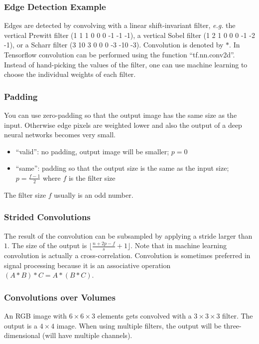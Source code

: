 \documentclass{article}
\begin{document}
\subsubsection{Edge Detection Example}
Edges are detected by convolving with a linear shift-invariant filter, \emph{e.g.} the vertical Prewitt filter
(1 1 1 0 0 0 -1 -1 -1), a vertical Sobel filter (1 2 1 0 0 0 -1 -2 -1), or a Scharr filter
(3 10 3 0 0 0 -3 -10 -3).
Convolution is denoted by $*$.
In Tensorflow convolution can be performed using the function ``tf.nn.conv2d''.
Instead of hand-picking the values of the filter, one can use machine learning to choose the individual weights of each filter.

\subsubsection{Padding}
You can use zero-padding so that the output image has the same size as the input.
Otherwise edge pixels are weighted lower and also the output of a deep neural networks becomes very small.
\begin{itemize}
  \item ``valid'': no padding, output image will be smaller; $p=0$
  \item ``same'': padding so that the output size is the same as the input size; $p=\frac{f-1}{2}$ where $f$ is the filter size
\end{itemize}
The filter size $f$ usually is an odd number.

\subsubsection{Strided Convolutions}
The result of the convolution can be subsampled by applying a stride larger than $1$.
The size of the output is $\lfloor\frac{n+2p-f}{s}+1\rfloor$.
Note that in machine learning convolution is actually a cross-correlation.
Convolution is sometimes preferred in signal processing because it is an associative operation $(A\ast B)\ast C=A\ast (B\ast C)$.

\subsubsection{Convolutions over Volumes}
An RGB image with $6\times 6\times 3$ elements gets convolved with a $3\times 3\times 3$ filter.
The output is a $4\times 4$ image.
When using multiple filters, the output will be three-dimensional (will have multiple channels).
\end{document}
